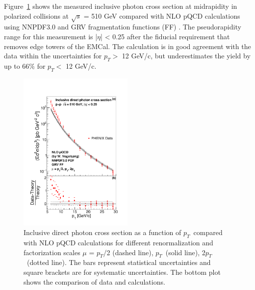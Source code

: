 \documentclass[twocolumn,letterpaper,aps,prl,longbibliography,superscriptaddress,floatfix]{revtex4-2}
\newcommand{\pT}{\ensuremath{p_T}}
\begin{document}
Figure~\ref{fig:inc} shows the measured inclusive photon cross section at midrapidity in polarized collisions at $\sqrt{s}$ = 510 GeV compared with NLO pQCD calculations \cite{PhysRevD.48.3136,PhysRevD.50.1901} using NNPDF3.0 \cite{Ball2015,Bonvini2015} and GRV fragmentation functions (FF) \cite{PhysRevD.45.3986}. The pseudorapidity range for this measurement is |$\eta$| < 0.25 after the fiducial requirement that removes edge towers of the EMCal. The calculation is in good agreement with the data within the uncertainties for $p_T >$ 12 GeV/c, but underestimates the yield by up to 66\% for $p_T <$ 12 GeV/c.

\begin{figure}
\includegraphics[width=0.5\textwidth]{CrossSection-photon-werner}
\caption{Inclusive direct photon cross section as a function of \pT\ compared with NLO pQCD calculations \cite{PhysRevD.48.3136,PhysRevD.50.1901} for different renormalization and factorization scales $\mu$ = \pT/2 (dashed line), \pT\ (solid line), 2\pT\ (dotted line). The bars represent statistical uncertainties and square brackets are for systematic uncertainties. The bottom plot shows the comparison of data and calculations.}
\label{fig:inc}
\end{figure}
\end{document}
